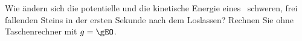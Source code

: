 Wie ändern sich die potentielle und die kinetische Energie eines \mstO\ schweren, frei fallenden Steins in der ersten Sekunde nach dem Loslassen? Rechnen Sie ohne Taschenrechner mit $g = \gEO$.
